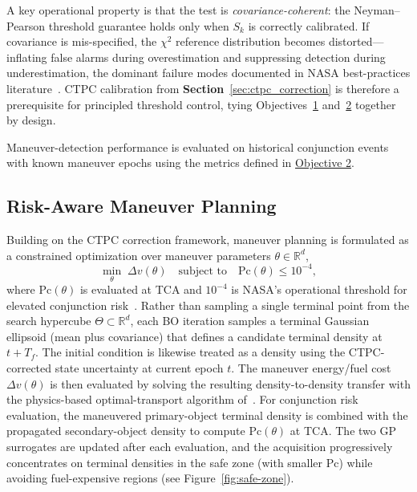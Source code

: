 \documentclass[10pt]{article}
\begin{document}
A key operational property is that the test is \emph{covariance-coherent}: the Neyman--Pearson threshold guarantee holds only when $S_k$ is correctly calibrated. If covariance is mis-specified, the $\chi^2$ reference distribution becomes distorted---inflating false alarms during overestimation and suppressing detection during underestimation, the dominant failure modes documented in NASA best-practices literature~\cite{nasa_bestpractices, hejduk2015}. CTPC calibration from \textbf{Section}~\ref{sec:ctpc_correction}  is therefore a prerequisite for principled threshold control, tying Objectives~\hyperref[sec:obj1]{1} and~\hyperref[sec:obj2]{2} together by design.

Maneuver-detection performance is evaluated on historical conjunction events with known maneuver epochs using the metrics defined in \hyperref[sec:obj2]{Objective 2}.

\subsection{Risk-Aware Maneuver Planning}\label{sec:BayesOpt_planning}

Building on the CTPC correction framework, maneuver planning is formulated as a constrained optimization over maneuver parameters $\theta \in \mathbb{R}^d$, %
\[
\min_{\theta}\; \Delta v(\theta)
\quad \text{subject to} \quad
\text{Pc}(\theta) \leq 10^{-4},
\]
where $\text{Pc}(\theta)$ is evaluated at TCA and $10^{-4}$ is NASA's operational threshold for elevated conjunction risk~\cite{nasa_bestpractices, hall2023_pcmultistep}. Rather than sampling a single terminal point from the search hypercube $\Theta \subset \mathbb{R}^d$, each BO iteration samples a terminal Gaussian ellipsoid (mean plus covariance) that defines a candidate terminal density at $t+T_f$. The initial condition is likewise treated as a density using the CTPC-corrected state uncertainty at current epoch $t$. The maneuver energy/fuel cost $\Delta v(\theta)$ is then evaluated by solving the resulting density-to-density transfer with the physics-based optimal-transport algorithm of~\cite{nodozi2023physics}. For conjunction risk evaluation, the maneuvered primary-object terminal density is combined with the propagated secondary-object density to compute $\text{Pc}(\theta)$ at TCA. The two GP surrogates are updated after each evaluation, and the acquisition progressively concentrates on terminal densities in the safe zone (with smaller Pc) while avoiding fuel-expensive regions (see Figure~\ref{fig:safe-zone}).
\end{document}

